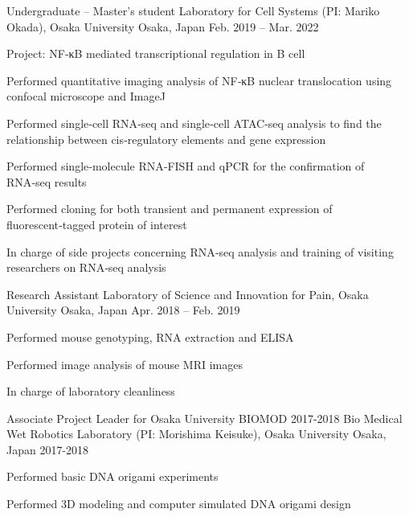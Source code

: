 \begin{cventries}
  \cventry
    {Undergraduate – Master’s student} %
    {Laboratory for Cell Systems (PI: Mariko Okada), Osaka University} %
    {Osaka, Japan} %
    {Feb. 2019 – Mar. 2022} %
    {
      \begin{cvitems} %
        \item {Project: NF‑κB mediated transcriptional regulation in B cell}
        \item {Performed quantitative imaging analysis of NF‑κB nuclear translocation using confocal microscope and ImageJ}
        \item {Performed single‑cell RNA‑seq and single‑cell ATAC‑seq analysis to find the relationship between cis‑regulatory elements and gene expression}
        \item {Performed single‑molecule RNA‑FISH and qPCR for the confirmation of RNA‑seq results}
        \item {Performed cloning for both transient and permanent expression of fluorescent‑tagged protein of interest}
        \item {In charge of side projects concerning RNA‑seq analysis and training of visiting researchers on RNA‑seq analysis}
      \end{cvitems}
    }
  
  \cventry
    {Research Assistant} %
    {Laboratory of Science and Innovation for Pain, Osaka University} %
    {Osaka, Japan} %
    {Apr. 2018 – Feb. 2019} %
    {
      \begin{cvitems} %
        \item {Performed mouse genotyping, RNA extraction and ELISA}
        \item {Performed image analysis of mouse MRI images}
        \item {In charge of laboratory cleanliness}
      \end{cvitems}
    }

  \cventry
    {Associate Project Leader for Osaka University BIOMOD 2017-2018} %
    {Bio Medical Wet Robotics Laboratory (PI: Morishima Keisuke), Osaka University} %
    {Osaka, Japan} %
    {2017-2018} %
    {
      \begin{cvitems} %
        \item {Performed basic DNA origami experiments}
        \item {Performed 3D modeling and computer simulated DNA origami design}
      \end{cvitems}
    }


\end{cventries}

